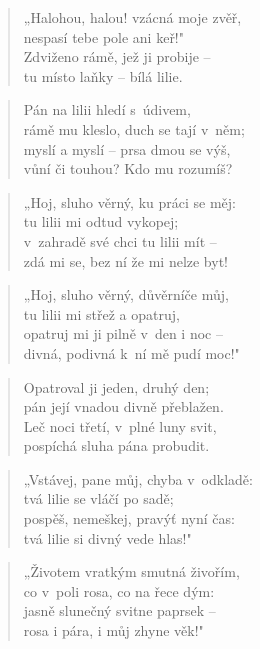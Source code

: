\begin{verse}
„Halohou, halou! vzácná moje zvěř, \\
nespasí tebe pole ani keř!" \\
Zdviženo rámě, jež ji probije -- \\
tu místo laňky -- bílá lilie.
\end{verse}

\begin{verse}
Pán na lilii hledí s~údivem, \\
rámě mu kleslo, duch se tají v~něm; \\
myslí a myslí -- prsa dmou se výš, \\
vůní či touhou? Kdo mu rozumíš?
\end{verse}

\begin{verse}
„Hoj, sluho věrný, ku práci se měj: \\
tu lilii mi odtud vykopej; \\
v~zahradě své chci tu lilii mít -- \\
zdá mi se, bez ní že mi nelze byt!
\end{verse}

\begin{verse}
„Hoj, sluho věrný, důvěrníče můj, \\
tu lilii mi střež a opatruj, \\
opatruj mi ji pilně v~den i noc -- \\
divná, podivná k~ní mě pudí moc!"
\end{verse}

\begin{verse}
Opatroval ji jeden, druhý den; \\
pán její vnadou divně přeblažen. \\
Leč noci třetí, v~plné luny svit, \\
pospíchá sluha pána probudit.
\end{verse}

\begin{verse}
„Vstávej, pane můj, chyba v~odkladě: \\
tvá lilie se vláčí po sadě; \\
pospěš, nemeškej, pravýť nyní čas: \\
tvá lilie si divný vede hlas!"
\end{verse}

\begin{verse}
„Životem vratkým smutná živořím, \\
co v~poli rosa, co na řece dým: \\
jasně slunečný svitne paprsek -- \\
rosa i pára, i můj zhyne věk!"
\end{verse}

